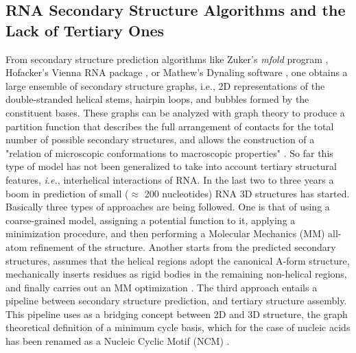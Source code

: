 \subsection{RNA Secondary Structure Algorithms and the Lack of Tertiary Ones}
From   secondary   structure   prediction  algorithms   like   Zuker's
\textit{mfold} program \cite{zuker2003}, Hofacker's Vienna RNA package
\cite{hofacker1994}, or Mathew's Dynaling software \cite{mathews2002},
one obtains a  large ensemble of secondary structure  graphs, i.e., 2D
representations of  the double-stranded helical stems,  hairpin loops,
and  bubbles formed  by the  constituent bases.   These graphs  can be
analyzed  with  graph theory  to  produce  a partition  function  that
describes the  full arrangement  of contacts for  the total  number of
possible  secondary  structures,  and  allows the  construction  of  a
"relation  of  microscopic  conformations to  macroscopic  properties"
\cite{chen2000}. So far this type of model has not been generalized to
take  into   account  tertiary  structural   features,  \textit{i.e.},
interhelical interactions  of RNA.  In the  last two to three  years a
boom  in  prediction  of  small ($\approx$  200  nucleotides)  RNA  3D
structures has started. Basically three  types of approaches are being
followed.  One  is that of  using a coarse-grained model,  assigning a
potential function to it, applying  a minimization procedure, and then
performing   a   Molecular    Mechanics   (MM)   all-atom   refinement
\cite{das2007,  ding2008,  jonikas2009a}  of the  structure.   Another
starts  from  the predicted  secondary  structures,  assumes that  the
helical  regions adopt  the canonical  A-form structure,  mechanically
inserts residues as rigid bodies in the remaining non-helical regions,
and finally  carries out an MM  optimization \cite{martinez2008}.  The
third  approach   entails  a  pipeline  between   secondary  structure
prediction, and tertiary structure assembly.   This pipeline uses as a
bridging concept  between 2D and  3D structure, the  graph theoretical
definition of  a minimum cycle  basis, which  for the case  of nucleic
acids   has   been  renamed   as   a   Nucleic  Cyclic   Motif   (NCM)
\cite{parisien2008}.


